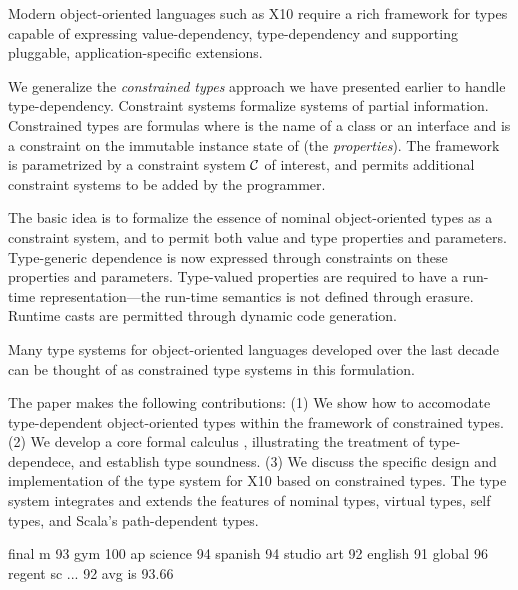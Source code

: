 Modern object-oriented languages such as X10 require a rich framework for types
capable of expressing value-dependency, type-dependency and supporting
pluggable, application-specific extensions.

We generalize the {\em constrained types} approach we have presented
earlier to handle type-dependency.  Constraint systems formalize
systems of partial information.  Constrained types are formulas
 where  is the name of a class or an interface and
 is a constraint on the immutable instance state of 
 (the {\em properties}). The framework is parametrized by 
a constraint system $\cal C$ of interest, and permits additional
constraint systems to be added by the programmer.

The basic idea is to formalize the essence of nominal object-oriented
types as a constraint system, and to permit both value and type
properties and parameters.  Type-generic dependence is now expressed
through constraints on these properties and parameters.  Type-valued
properties are required to have a run-time representation---the
run-time semantics is not defined through erasure. Runtime casts are
permitted through dynamic code generation.

Many type systems for object-oriented languages developed over the
last decade can be thought of as constrained type systems in this
formulation.

The paper makes the following contributions: (1) We show how to
accomodate type-dependent object-oriented types within the framework
of constrained types. (2) We develop a core formal calculus \gxx,
illustrating the treatment of type-dependece, and establish type
soundness.  (3) We discuss the specific design and implementation of
the type system for X10 based on constrained types.  The type system
integrates and extends the features of nominal types, virtual types,
self types, and Scala's path-dependent types.


final m 93
gym 100
ap science 94
spanish 94
studio art 92
english 91
global 96
regent sc ... 92
avg is 93.66